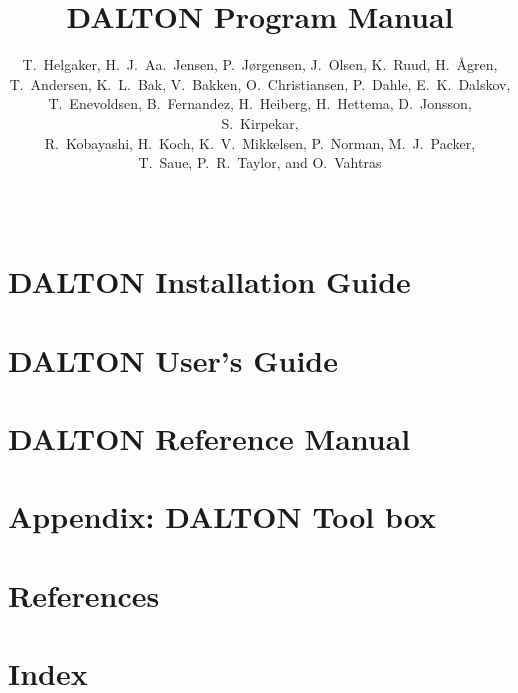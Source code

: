 \documentclass[11pt,a4page]{report}
\begin{document}
%

%
\baselineskip=15pt
%
\title{DALTON Program Manual}

%
\author{T.~Helgaker, H.~J.~Aa.~Jensen, P.~J{\o}rgensen, J.~Olsen,
K.~Ruud, H.~{\AA}gren,\smallskip\\ T.~Andersen, K.~L.~Bak, V.~Bakken,
O.~Christiansen, P.~Dahle, E.~K.~Dalskov, \\ T.~Enevoldsen, B.~Fernandez,
H.~Heiberg, H.~Hettema, D.~Jonsson, S.~Kirpekar,\\ R.~Kobayashi,
H.~Koch, K.~V.~Mikkelsen, P.~Norman, M.~J.~Packer, \\T.~Saue,
P.~R.~Taylor, and O.~Vahtras}  
%
\date{\mbox{\ }}
%
\maketitle
%


\part{DALTON Installation Guide}


\part{DALTON User's Guide}











\part{DALTON Reference Manual}






\part{Appendix: DALTON Tool box}

\part{References}

%
\part{Index}
\printindex
\end{document}
